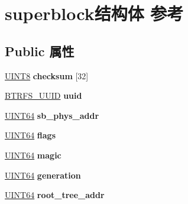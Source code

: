 \hypertarget{structsuperblock}{}\section{superblock结构体 参考}
\label{structsuperblock}
\subsection*{Public 属性}
\begin{DoxyCompactItemize}
\item 
\mbox{\label{structsuperblock_a229436172e4510e603c3480bac70eca1}} 
\hyperlink{_processor_bind_8h_ab27e9918b538ce9d8ca692479b375b6a}{U\+I\+N\+T8} {\bfseries checksum} \mbox{[}32\mbox{]}
\item 
\mbox{\label{structsuperblock_a17ca70bc1c52c360d7e9ffe39b91562e}} 
\hyperlink{struct_b_t_r_f_s___u_u_i_d}{B\+T\+R\+F\+S\+\_\+\+U\+U\+ID} {\bfseries uuid}
\item 
\mbox{\label{structsuperblock_a398607d4d49731903afec83304c8e087}} 
\hyperlink{_processor_bind_8h_a57be03562867144161c1bfee95ca8f7c}{U\+I\+N\+T64} {\bfseries sb\+\_\+phys\+\_\+addr}
\item 
\mbox{\label{structsuperblock_a4b909aae77016500de2e59cbfddc53cc}} 
\hyperlink{_processor_bind_8h_a57be03562867144161c1bfee95ca8f7c}{U\+I\+N\+T64} {\bfseries flags}
\item 
\mbox{\label{structsuperblock_a5ab901f4f7b7867725e8a3da7a2ad109}} 
\hyperlink{_processor_bind_8h_a57be03562867144161c1bfee95ca8f7c}{U\+I\+N\+T64} {\bfseries magic}
\item 
\mbox{\label{structsuperblock_a22f7d3d821de856a5683f4c49949e2dc}} 
\hyperlink{_processor_bind_8h_a57be03562867144161c1bfee95ca8f7c}{U\+I\+N\+T64} {\bfseries generation}
\item 
\mbox{\label{structsuperblock_a8ed5e8d6b0d8cf6a2eb3d8b330aff322}} 
\hyperlink{_processor_bind_8h_a57be03562867144161c1bfee95ca8f7c}{U\+I\+N\+T64} {\bfseries root\+\_\+tree\+\_\+addr}
\item 
\mbox{\label{structsuperblock_a18f22a56a358856560d520e2b6082553}} 

\end{DoxyCompactItemize}
